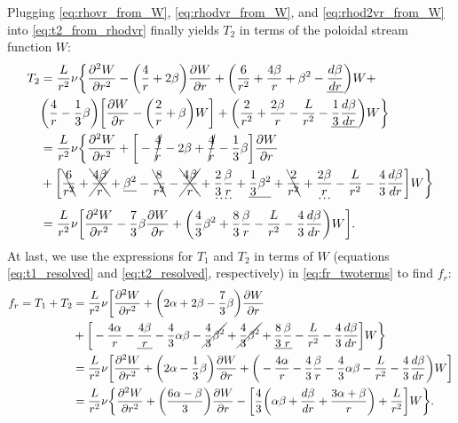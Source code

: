 \documentclass[12pt]{article} %
\newcommand{\pderiv}[2]{\frac{\partial#1}{\partial#2}}
\newcommand{\ppderiv}[2]{\frac{\partial^2#1}{\partial#2^2}}
\begin{document}
	Plugging \eqref{eq:rhovr_from_W}, \eqref{eq:rhodvr_from_W}, and \eqref{eq:rhod2vr_from_W} into \eqref{eq:t2_from_rhodvr} finally yields $T_2$ in terms of the poloidal stream function $W$:
	\begin{align}
	T_2 &=\frac{L}{r^2}\nu\bigg{\{}\ppderiv{W}{r} - \bigg{(}\frac{4}{r}+2\beta\bigg{)}\pderiv{W}{r}+\bigg{(}\frac{6}{r^2}+\frac{4\beta}{r}+\beta^2-\underline{\frac{d\beta}{dr}}\bigg{)}W +\nonumber\\ &\bigg{(}\frac{4}{r}-\frac{1}{3}\beta\bigg{)}\bigg{[}\pderiv{W}{r}-\bigg{(}\frac{2}{r}+\beta\bigg{)}W\bigg{]} + \bigg{(}\frac{2}{r^2}+\frac{2\beta}{r}-\frac{L}{r^2}-\underline{\frac{1}{3}\frac{d\beta}{dr}}\bigg{)}W\bigg{\}}\nonumber \\
	&= \frac{L}{r^2}\nu\bigg{\{}\ppderiv{W}{r}+\bigg{[}-\cancel{\frac{4}{r}}-2\beta+\cancel{\frac{4}{r}}-\frac{1}{3}\beta\bigg{]}\pderiv{W}{r}\nonumber \\
	&+ \bigg{[}\bcancel{\frac{6}{r^2}}+\xcancel{\frac{4\beta}{r}}+\underline{\beta^2}-\bcancel{\frac{8}{r^2}}-\xcancel{\frac{4\beta}{r}}+\dotuline{\frac{2}{3}\frac{\beta}{r}} + \underline{\frac{1}{3}\beta^2}+\bcancel{\frac{2}{r^2}} + \dotuline{\frac{2\beta}{r}} - \frac{L}{r^2}-\frac{4}{3}\frac{d\beta}{dr}\bigg{]}W\bigg{\}}\nonumber\\
	&=\frac{L}{r^2}\nu\bigg{[}\ppderiv{W}{r}-\frac{7}{3}\beta\pderiv{W}{r}+\bigg{(}\frac{4}{3}\beta^2+\frac{8}{3}\frac{\beta}{r}-\frac{L}{r^2}-\frac{4}{3}\frac{d\beta}{dr}\bigg{)}W\bigg{]}.
	\label{eq:t2_resolved} 
	\end{align}
	At last, we use the expressions for $T_1$ and $T_2$ in terms of $W$ (equations \eqref{eq:t1_resolved} and \eqref{eq:t2_resolved}, respectively) in \eqref{eq:fr_twoterms} to find $f_r$:
	\begin{align}
	f_r = T_1 + T_2 &= \frac{L}{r^2}\nu\bigg{[}\ppderiv{W}{r} + \bigg{(}2\alpha + 2\beta - \frac{7}{3}\beta\bigg{)}\pderiv{W}{r}\nonumber\\
	&+\bigg{[}-\frac{4\alpha}{r}-\underline{\frac{4\beta}{r}}- \frac{4}{3}\alpha\beta - \cancel{\frac{4}{3}\beta^2} + \cancel{\frac{4}{3}\beta^2}+\underline{\frac{8}{3}\frac{\beta}{r}} - \frac{L}{r^2}-\frac{4}{3}\frac{d\beta}{dr}\bigg{]}W\bigg{\}}\nonumber\\
	&= \frac{L}{r^2}\nu\bigg{[}\ppderiv{W}{r}+\bigg{(}2\alpha-\frac{1}{3}\beta\bigg{)}\pderiv{W}{r}+\bigg{(}-\frac{4\alpha}{r}-\frac{4}{3}\frac{\beta}{r}-\frac{4}{3}\alpha\beta - \frac{L}{r^2}- \frac{4}{3}\frac{d\beta}{dr}\bigg{)}W\bigg{]}\nonumber\\
	&= \frac{L}{r^2}\nu\bigg{\{}\ppderiv{W}{r}+\bigg{(}\frac{6\alpha-\beta}{3}\bigg{)}\pderiv{W}{r}-\bigg{[}\frac{4}{3}\bigg{(}\alpha\beta +\frac{d\beta}{dr}+\frac{3\alpha + \beta}{r}\bigg{)}+\frac{L}{r^2}\bigg{]}W\bigg{\}}.
	\end{align}
	
\end{document}

